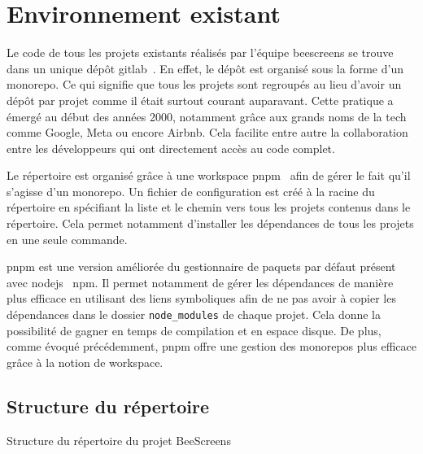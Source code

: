 \section{Environnement existant}

Le code de tous les projets existants réalisés par l'équipe \gls{beescreens} se trouve dans un unique dépôt \gls{gitlab}~\cite{beescreens}. En effet, le dépôt est organisé sous la forme d'un monorepo. Ce qui signifie que  tous les projets sont regroupés au lieu d'avoir un dépôt par projet comme il était surtout courant auparavant. Cette pratique a émergé au début des années 2000, notamment grâce aux grands noms de la tech comme Google, Meta ou encore Airbnb. Cela facilite entre autre la collaboration entre les développeurs qui ont directement accès au code complet.

Le répertoire est organisé grâce à une workspace \gls{pnpm}~\cite{pnpmworkspace} afin de gérer le fait qu'il s'agisse d'un monorepo. Un fichier de configuration est créé à la racine du répertoire en spécifiant la liste et le chemin vers tous les projets contenus dans le répertoire. Cela permet notamment d'installer les dépendances de tous les projets en une seule commande.

\gls{pnpm} est une version améliorée du gestionnaire de paquets par défaut présent avec \gls{nodejs}~\cite{nodejs} \gls{npm}. Il permet notamment de gérer les dépendances de manière plus efficace en utilisant des liens symboliques afin de ne pas avoir à copier les dépendances dans le dossier \texttt{node\_modules} de chaque projet. Cela donne la possibilité de gagner en temps de compilation et en espace disque. De plus, comme évoqué précédemment, \gls{pnpm} offre une gestion des monorepos plus efficace grâce à la notion de workspace.

\subsection{Structure du répertoire}

\begin{listing}[H]
  \begin{tcolorbox}[arc=0mm,colback=white!5!white]
  \end{tcolorbox}
  \caption{Structure du répertoire du projet BeeScreens}
  \label{listing:beescreeens-repo-structure}
\end{listing}

